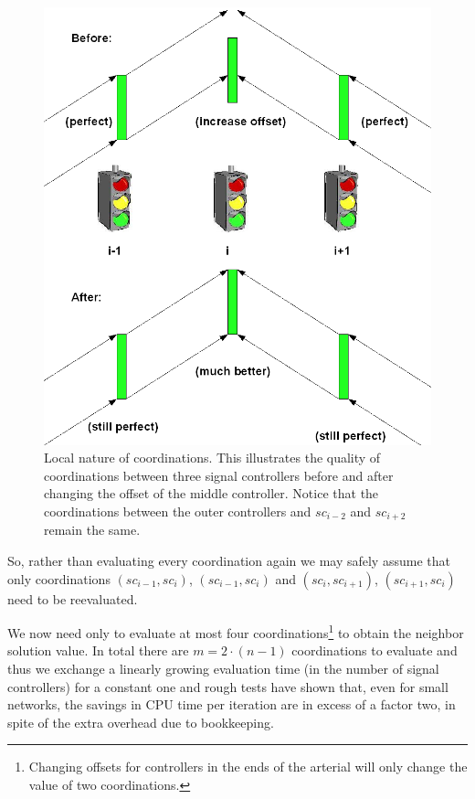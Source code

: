 \begin{figure}[htbp]
\centering
\includegraphics[scale=0.3]{delta_eval.png}
\caption{Local nature of coordinations. This illustrates the quality of coordinations between three signal controllers before and after changing the offset of the middle controller. Notice that the coordinations between the outer controllers and $sc_{i-2}$ and $sc_{i+2}$ remain the same.}
\label{fig:delta_eval}
\end{figure}

So, rather than evaluating every coordination again we may safely assume that only coordinations $(sc_{i-1},sc_{i})$, $(sc_{i-1},sc_{i})$ and $(sc_{i},sc_{i+1})$, $(sc_{i+1},sc_{i})$ need to be reevaluated. 

We now need only to evaluate at most four coordinations\footnote{Changing offsets for controllers in the ends of the arterial will only change the value of two coordinations.} to obtain the neighbor solution value. In total there are $m = 2\cdot (n-1)$ coordinations to evaluate and thus we exchange a linearly growing evaluation time (in the number of signal controllers) for a constant one and rough tests have shown that, even for small networks, the savings in CPU time per iteration are in excess of a factor two, in spite of the extra overhead due to bookkeeping.

